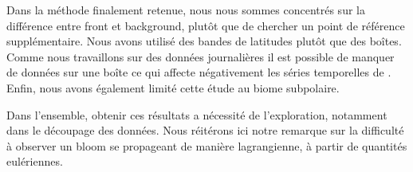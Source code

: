 \begin{figure}
  \centering
  \label{fig:inv-hf}
\end{figure}

Dans la méthode finalement retenue, nous nous sommes concentrés sur la différence entre front et background, plutôt que de chercher un point de référence supplémentaire.
Nous avons utilisé des bandes de latitudes plutôt que des boîtes. Comme nous travaillons sur des données journalières il est possible de manquer de données sur une boîte ce qui affecte négativement les séries temporelles de .
Enfin, nous avons également limité cette étude au biome subpolaire.

Dans l'ensemble, obtenir ces résultats a nécessité de l'exploration, notamment dans le découpage des données.
Nous réitérons ici notre remarque sur la difficulté à observer un bloom se propageant de manière lagrangienne, à partir de quantités eulériennes.
